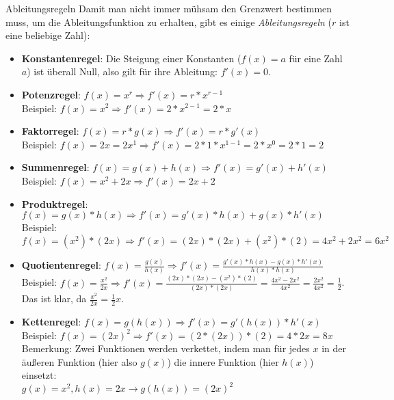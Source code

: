 \begin{bla}{Ableitungsregeln}
  Damit man nicht immer mühsam den Grenzwert bestimmen muss, um die Ableitungsfunktion zu erhalten, gibt es einige \emph{Ableitungsregeln} ($r$ ist eine beliebige Zahl):
  \begin{itemize}
    \item \textbf{Konstantenregel}: Die Steigung einer Konstanten ($f(x)=a$ für eine Zahl $a$) ist überall Null, also gilt für ihre Ableitung: $f'(x)=0$.
    \item \textbf{Potenzregel}: $f(x)=x^r \Rightarrow f'(x)=r*x^{r-1}$ \\
    Beispiel: $f(x)=x^2 \Rightarrow f'(x)=2*x^{2-1}=2*x$

    \item \textbf{Faktorregel}: $f(x)=r*g(x) \Rightarrow f'(x)=r*g'(x)$ \\
    Beispiel: $f(x)=2x=2x^1 \Rightarrow f'(x)=2*1*x^{1-1}=2*x^0=2*1=2$

    \item \textbf{Summenregel}: $f(x)=g(x)+h(x) \Rightarrow f'(x)=g'(x)+h'(x)$ \\
    Beispiel: $f(x)=x^2+2x \Rightarrow f'(x)=2x+2$

    \item \textbf{Produktregel}: $f(x)=g(x)*h(x) \Rightarrow f'(x)=g'(x)*h(x)+g(x)*h'(x)$ \\
    Beispiel: $f(x)=(x^2)*(2x) \Rightarrow f'(x)=(2x)*(2x)+(x^2)*(2)=4x^2+2x^2=6x^2$

    \item \textbf{Quotientenregel}: $f(x)=\frac{g(x)}{h(x)} \Rightarrow f'(x)=\frac{g'(x)*h(x)-g(x)*h'(x)}{h(x)*h(x)}$ \\
    Beispiel: $f(x)=\frac{x^2}{2x} \Rightarrow f'(x)=\frac{(2x)*(2x)-(x^2)*(2)}{(2x)*(2x)}=\frac{4x^2-2x^2}{4x^2}=\frac{2x^2}{4x^2}=\frac{1}{2}$. Das ist klar, da $\frac{x^2}{2x}=\frac{1}{2}x$.

    \item \textbf{Kettenregel}: $f(x)=g(h(x)) \Rightarrow f'(x)=g'(h(x))*h'(x)$ \\
    Beispiel: $f(x)={(2x)}^2 \Rightarrow f'(x)=(2*(2x))*(2)=4*2x=8x$ \\
    Bemerkung: Zwei Funktionen werden verkettet, indem man für jedes $x$ in der äußeren Funktion (hier also $g(x)$) die innere Funktion (hier $h(x)$) einsetzt: \\ $g(x)=x^2, h(x)=2x \rightarrow g(h(x))={(2x)}^2$
  \end{itemize}
\end{bla}



